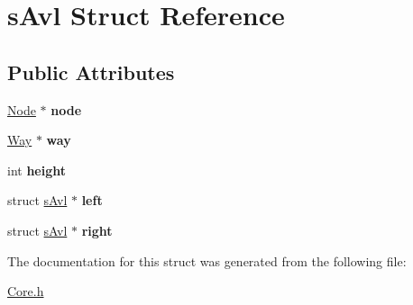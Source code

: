 \hypertarget{structsAvl}{\section{s\-Avl Struct Reference}
\label{structsAvl}
}
\subsection*{Public Attributes}
\begin{DoxyCompactItemize}
\item 
\hypertarget{structsAvl_a86e4262b6dcb6d69a23274064a90c2c7}{\hyperlink{structNode}{Node} $\ast$ {\bfseries node}}\label{structsAvl_a86e4262b6dcb6d69a23274064a90c2c7}

\item 
\hypertarget{structsAvl_a1f65b88ea657e036d81dd9587b1f7566}{\hyperlink{structWay}{Way} $\ast$ {\bfseries way}}\label{structsAvl_a1f65b88ea657e036d81dd9587b1f7566}

\item 
\hypertarget{structsAvl_a1678d05e6984326e3f25002f9b5d4ac9}{int {\bfseries height}}\label{structsAvl_a1678d05e6984326e3f25002f9b5d4ac9}

\item 
\hypertarget{structsAvl_a97ab2166bf624b8cc03c6a02ba46ea9d}{struct \hyperlink{structsAvl}{s\-Avl} $\ast$ {\bfseries left}}\label{structsAvl_a97ab2166bf624b8cc03c6a02ba46ea9d}

\item 
\hypertarget{structsAvl_a251c789fc0532eae2b7a6fadd64d39a4}{struct \hyperlink{structsAvl}{s\-Avl} $\ast$ {\bfseries right}}\label{structsAvl_a251c789fc0532eae2b7a6fadd64d39a4}

\end{DoxyCompactItemize}


The documentation for this struct was generated from the following file\-:\begin{DoxyCompactItemize}
\item 
\hyperlink{Core_8h}{Core.\-h}\end{DoxyCompactItemize}
